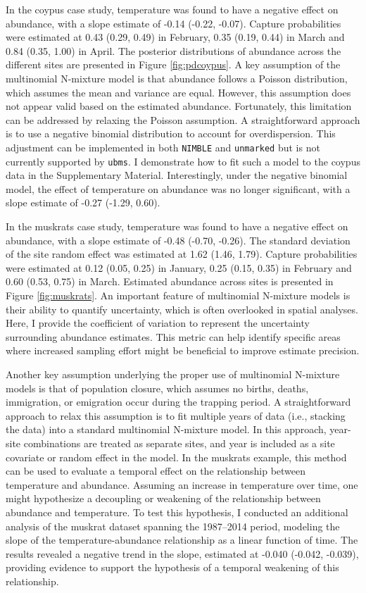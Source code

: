 \documentclass[
  11pt,
  a4paper,
]{article}
\begin{document}
In the coypus case study, temperature was found to have a negative effect on abundance, with a slope estimate of -0.14 (-0.22, -0.07). Capture probabilities were estimated at 0.43 (0.29, 0.49) in February, 0.35 (0.19, 0.44) in March and 0.84 (0.35, 1.00) in April. The posterior distributions of abundance across the different sites are presented in Figure \ref{fig:pdcoypus}. A key assumption of the multinomial N-mixture model is that abundance follows a Poisson distribution, which assumes the mean and variance are equal. However, this assumption does not appear valid based on the estimated abundance. Fortunately, this limitation can be addressed by relaxing the Poisson assumption. A straightforward approach is to use a negative binomial distribution to account for overdispersion. This adjustment can be implemented in both \texttt{NIMBLE} and \texttt{unmarked} but is not currently supported by \texttt{ubms}. I demonstrate how to fit such a model to the coypus data in the Supplementary Material. Interestingly, under the negative binomial model, the effect of temperature on abundance was no longer significant, with a slope estimate of -0.27 (-1.29, 0.60).

In the muskrats case study, temperature was found to have a negative effect on abundance, with a slope estimate of -0.48 (-0.70, -0.26). The standard deviation of the site random effect was estimated at 1.62 (1.46, 1.79). Capture probabilities were estimated at 0.12 (0.05, 0.25) in January, 0.25 (0.15, 0.35) in February and 0.60 (0.53, 0.75) in March. Estimated abundance across sites is presented in Figure \ref{fig:muskrats}. An important feature of multinomial N-mixture models is their ability to quantify uncertainty, which is often overlooked in spatial analyses. Here, I provide the coefficient of variation to represent the uncertainty surrounding abundance estimates. This metric can help identify specific areas where increased sampling effort might be beneficial to improve estimate precision.

Another key assumption underlying the proper use of multinomial N-mixture models is that of population closure, which assumes no births, deaths, immigration, or emigration occur during the trapping period. A straightforward approach to relax this assumption is to fit multiple years of data (i.e., stacking the data) into a standard multinomial N-mixture model. In this approach, year-site combinations are treated as separate sites, and year is included as a site covariate or random effect in the model. In the muskrats example, this method can be used to evaluate a temporal effect on the relationship between temperature and abundance. Assuming an increase in temperature over time, one might hypothesize a decoupling or weakening of the relationship between abundance and temperature. To test this hypothesis, I conducted an additional analysis of the muskrat dataset spanning the 1987--2014 period, modeling the slope of the temperature-abundance relationship as a linear function of time. The results revealed a negative trend in the slope, estimated at -0.040 (-0.042, -0.039), providing evidence to support the hypothesis of a temporal weakening of this relationship.
\end{document}

